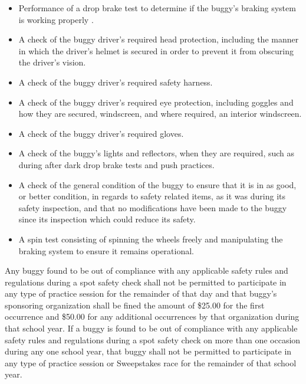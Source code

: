 	\begin{itemize}

		\item Performance of a drop brake test to determine if the buggy's braking
		system is working properly .

		\item A check of the buggy driver's required head protection, including the
		manner in which the driver's helmet is secured in order to prevent it from
		obscuring the driver's vision.

		\item A check of the buggy driver's required safety harness.

		\item A check of the buggy driver's required eye protection, including goggles
		and how they are secured, windscreen, and where required, an interior
		windscreen.

		\item A check of the buggy driver's required gloves.

		\item A check of the buggy's lights and reflectors, when they are required,
		such as during after dark drop brake tests and push practices.

		\item A check of the general condition of the buggy to ensure that it is in as
		good, or better condition, in regards to safety related items, as it was during
		its safety inspection, and that no modifications have been made to the buggy
		since its inspection which could reduce its safety.
		
		\item A spin test consisting of spinning the wheels freely and manipulating the 
		braking system to ensure it remains operational.

	\end{itemize}

	Any buggy found to be out of compliance with any applicable safety rules and
	regulations during a spot safety check shall not be permitted to participate in
	any type of practice session for the remainder of that day and that buggy's
	sponsoring organization shall be fined the amount of \$25.00 for the first
	occurrence and \$50.00 for any additional occurrences by that organization
	during that school year. If a buggy is found to be out of compliance with any
	applicable safety rules and regulations during a spot safety check on more than
	one occasion during any one school year, that buggy shall not be permitted to
	participate in any type of practice session or Sweepstakes race for the
	remainder of that school year.

